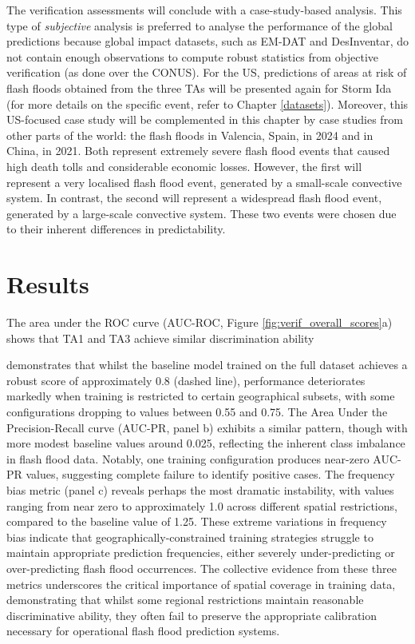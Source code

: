 The verification assessments will conclude with a case-study-based analysis. This type of \textit{subjective} analysis is preferred to analyse the performance of the global predictions because global impact datasets, such as EM-DAT and DesInventar, do not contain enough observations to compute robust statistics from objective verification (as done over the CONUS). For the US, predictions of areas at risk of flash floods obtained from the three TAs will be presented again for Storm Ida (for more details on the specific event, refer to Chapter \ref{datasets}). Moreover, this US-focused case study will be complemented in this chapter by case studies from other parts of the world: the flash floods in Valencia, Spain, in 2024 and in China, in 2021. Both represent extremely severe flash flood events that caused high death tolls and considerable economic losses. However, the first will represent a very localised flash flood event, generated by a small-scale convective system. In contrast, the second will represent a widespread flash flood event, generated by a large-scale convective system. These two events were chosen due to their inherent differences in predictability.


\section{Results}
\label{regional_to_global_training_results}



The area under the ROC curve (AUC-ROC, Figure \ref{fig:verif_overall_scores}a) shows that TA1 and TA3 achieve similar discrimination ability 


demonstrates that whilst the baseline model trained on the full dataset achieves a robust score of approximately 0.8 (dashed line), performance deteriorates markedly when training is restricted to certain geographical subsets, with some configurations dropping to values between 0.55 and 0.75. The Area Under the Precision-Recall curve (AUC-PR, panel b) exhibits a similar pattern, though with more modest baseline values around 0.025, reflecting the inherent class imbalance in flash flood data. Notably, one training configuration produces near-zero AUC-PR values, suggesting complete failure to identify positive cases. The frequency bias metric (panel c) reveals perhaps the most dramatic instability, with values ranging from near zero to approximately 1.0 across different spatial restrictions, compared to the baseline value of 1.25. These extreme variations in frequency bias indicate that geographically-constrained training strategies struggle to maintain appropriate prediction frequencies, either severely under-predicting or over-predicting flash flood occurrences. The collective evidence from these three metrics underscores the critical importance of spatial coverage in training data, demonstrating that whilst some regional restrictions maintain reasonable discriminative ability, they often fail to preserve the appropriate calibration necessary for operational flash flood prediction systems.


